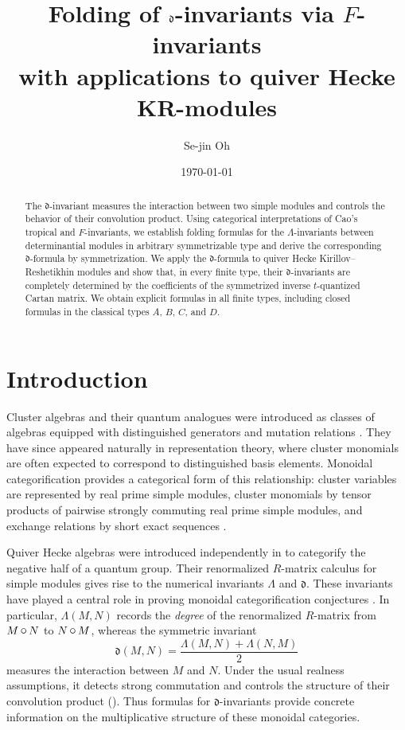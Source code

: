 \documentclass[12pt, leqno]{amsart}
\title[Folding of \(\de\)-invariants] {Folding of \(\de\)-invariants via \(F\)-invariants\\
with applications to quiver Hecke KR-modules}
\author[S.-j. Oh]{Se-jin Oh}
\date{\today}
\numberwithin{equation}{section}
\theoremstyle{plain}
\theoremstyle{definition}
\newcommand{\conv}{\mathop{\mathbin{\mbox{\large $\circ$}}}}
\newcommand{\de}{\mathfrak{d}}
\begin{document}
\begin{abstract}
The \(\de\)-invariant measures the interaction between two simple
modules and controls the behavior of their convolution product.
Using categorical interpretations of Cao's tropical and
\(F\)-invariants, we establish folding formulas for the
\(\Lambda\)-invariants between determinantial modules in arbitrary
symmetrizable type and derive the corresponding \(\de\)-formula
by symmetrization.
 We apply the \(\de\)-formula to quiver Hecke Kirillov--Reshetikhin modules 
 and show that, in every finite type, their
\(\de\)-invariants are completely determined by the coefficients
of the symmetrized inverse \(t\)-quantized Cartan matrix. 
We obtain explicit formulas in all finite types, including closed
formulas in the classical types \(A\), \(B\), \(C\), and \(D\).
\end{abstract}

\maketitle
\tableofcontents

\section*{Introduction}
\label{sec: introduction}

Cluster algebras and their quantum analogues were introduced as
classes of algebras equipped with distinguished generators and
mutation relations \cite{FZ02,BZ05}.  They have since appeared
naturally in representation theory, where cluster monomials are
often expected to correspond to distinguished basis elements.
Monoidal categorification provides a categorical form of this
relationship: cluster variables are represented by real prime simple
modules, cluster monomials by tensor products of pairwise
strongly commuting real prime simple modules, and exchange relations
by short exact sequences \cite{HL10}.

\smallskip

Quiver Hecke algebras were introduced independently in
\cite{KL1,KL2,R08} to categorify the negative half of a quantum
group. Their renormalized \(R\)-matrix calculus for
simple modules gives rise to the numerical invariants \(\Lambda\)
and \(\de\).  These
invariants have played a central role in proving monoidal
categorification conjectures \cite{KKKO18}.  In particular, \(\Lambda(M,N)\) 
records the \emph{degree} of the renormalized \(R\)-matrix from \(M\conv N\) to \(N\conv M\), whereas the symmetric invariant
\[
\de(M,N) = \frac{\Lambda(M,N)+\Lambda(N,M)}{2}
\]
measures the interaction between \(M\) and \(N\).  Under the usual realness assumptions, it detects strong commutation and controls
the structure of their convolution product (\cite{KKKO15,KKKO18}).  Thus formulas for \(\de\)-invariants provide concrete information on
the multiplicative structure of these monoidal categories.
\end{document}
